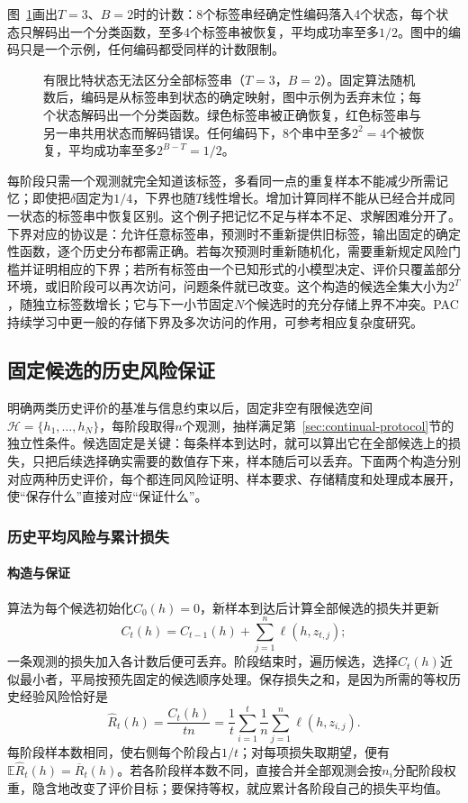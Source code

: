 图~\ref{fig:lt9-memory-counting}画出$T=3$、$B=2$时的计数：8个标签串经确定性编码落入4个状态，每个状态只解码出一个分类函数，至多4个标签串被恢复，平均成功率至多$1/2$。图中的编码只是一个示例，任何编码都受同样的计数限制。

\begin{figure}[htbp]
 \centering
 
 \caption{有限比特状态无法区分全部标签串（$T=3$，$B=2$）。固定算法随机数后，编码是从标签串到状态的确定映射，图中示例为丢弃末位；每个状态解码出一个分类函数。绿色标签串被正确恢复，红色标签串与另一串共用状态而解码错误。任何编码下，8个串中至多$2^2=4$个被恢复，平均成功率至多$2^{B-T}=1/2$。}
 \label{fig:lt9-memory-counting}
\end{figure}

每阶段只需一个观测就完全知道该标签，多看同一点的重复样本不能减少所需记忆；即使把$\delta$固定为$1/4$，下界也随$T$线性增长。增加计算同样不能从已经合并成同一状态的标签串中恢复区别。这个例子把记忆不足与样本不足、求解困难分开了。下界对应的协议是：允许任意标签串，预测时不重新提供旧标签，输出固定的确定性函数，逐个历史分布都需正确。若每次预测时重新随机化，需要重新规定风险门槛并证明相应的下界；若所有标签由一个已知形式的小模型决定、评价只覆盖部分环境，或旧阶段可以再次访问，问题条件就已改变。这个构造的候选全集大小为$2^T$，随独立标签数增长；它与下一小节固定$N$个候选时的充分存储上界不冲突。PAC持续学习中更一般的存储下界及多次访问的作用，可参考相应复杂度研究。

\subsection{固定候选的历史风险保证}
\label{sec:continual-fixed-candidates}

明确两类历史评价的基准与信息约束以后，固定非空有限候选空间$\mathcal H=\{h_1,\ldots,h_N\}$，每阶段取得$n$个观测，抽样满足第~\ref{sec:continual-protocol}节的独立性条件。候选固定是关键：每条样本到达时，就可以算出它在全部候选上的损失，只把后续选择确实需要的数值存下来，样本随后可以丢弃。下面两个构造分别对应两种历史评价，每个都连同风险证明、样本要求、存储精度和处理成本展开，使“保存什么”直接对应“保证什么”。

\subsubsection{历史平均风险与累计损失}

\paragraph{构造与保证}
算法为每个候选初始化$C_0(h)=0$，新样本到达后计算全部候选的损失并更新
\[
 C_t(h)=C_{t-1}(h)+\sum_{j=1}^n\ell(h,z_{t,j}) ;
\]
一条观测的损失加入各计数后便可丢弃。阶段结束时，遍历候选，选择$C_t(h)$近似最小者，平局按预先固定的候选顺序处理。保存损失之和，是因为所需的等权历史经验风险恰好是
\[
 \widehat R_t(h)=\frac{C_t(h)}{tn}
 =\frac1t\sum_{i=1}^t\frac1n\sum_{j=1}^n\ell(h,z_{i,j}) .
\]
每阶段样本数相同，使右侧每个阶段占$1/t$；对每项损失取期望，便有$\mathbb E\widehat R_t(h)=\overline R_t(h)$。若各阶段样本数不同，直接合并全部观测会按$n_i$分配阶段权重，隐含地改变了评价目标；要保持等权，就应累计各阶段自己的损失平均值。

